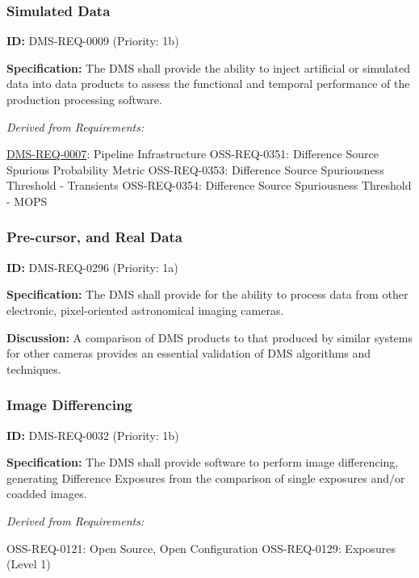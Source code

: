 \documentclass[SE,toc,lsstdraft]{lsstdoc}
\begin{document}
\subsubsection{Simulated Data}

\label{DMS-REQ-0009}
\textbf{ID:} DMS-REQ-0009 (Priority: 1b)

\textbf{Specification:} The DMS shall provide the ability to inject artificial or simulated data into data products to assess the functional and temporal performance of the production processing software.

\emph{Derived from Requirements:}

\hyperref[DMS-REQ-0007]{DMS-REQ-0007}:
Pipeline Infrastructure \newline
OSS-REQ-0351:
Difference Source Spurious Probability Metric \newline
OSS-REQ-0353:
Difference Source Spuriousness Threshold - Transients \newline
OSS-REQ-0354:
Difference Source Spuriousness Threshold - MOPS \newline

\subsubsection{Pre-cursor, and Real Data}

\label{DMS-REQ-0296}
\textbf{ID:} DMS-REQ-0296 (Priority: 1a)

\textbf{Specification:} The DMS shall provide for the ability to process data from other electronic, pixel-oriented astronomical imaging cameras.

\textbf{Discussion: }A comparison of DMS products to that produced by similar systems for other cameras provides an essential validation of DMS algorithms and techniques.

\subsubsection{Image Differencing}

\label{DMS-REQ-0032}
\textbf{ID:} DMS-REQ-0032 (Priority: 1b)

\textbf{Specification:} The DMS shall provide software to perform image differencing, generating Difference Exposures from the comparison of single exposures and/or coadded images.

\emph{Derived from Requirements:}

OSS-REQ-0121:
Open Source, Open Configuration \newline
OSS-REQ-0129:
Exposures (Level 1) \newline
\end{document}

